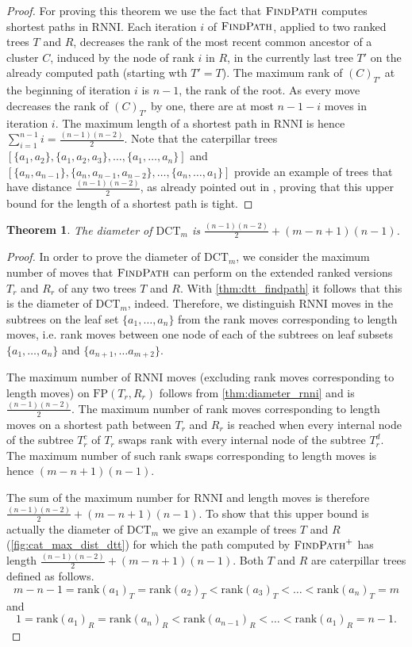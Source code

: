 \documentclass[11pt]{amsart}
\newtheorem{theorem}{Theorem}
\newcommand{\rnni}{\mathrm{RNNI}}
\newcommand{\findpath}{\textsc{FindPath}}
\newcommand{\rank}{\mathrm{rank}}
\newcommand{\fp}{\mathrm{FP}}
\newcommand{\dct}{\mathrm{DCT}}
\begin{document}
\begin{proof}
	For proving this theorem we use the fact that $\findpath$ computes shortest paths in $\rnni$.
	Each iteration $i$ of $\findpath$, applied to two ranked trees $T$ and $R$, decreases the rank of the most recent common ancestor of a cluster $C$, induced by the node of rank $i$ in $R$, in the currently last tree $T'$ on the already computed path (starting wth $T' = T$).
	The maximum rank of $(C)_{T'}$ at the beginning of iteration $i$ is $n-1$, the rank of the root.
	As every move decreases the rank of $(C)_{T'}$ by one, there are at most $n-1-i$ moves in iteration $i$.
	The maximum length of a shortest path in $\rnni$ is hence $\sum \limits_{i = 1}^{n-1} i = \frac{(n-1)(n-2)}{2}$.
	Note that the caterpillar trees $[\{a_1, a_2\}, \{a_1, a_2, a_3\}, \ldots, \{a_1, \ldots, a_n\}]$ and $[\{a_n, a_{n-1}\}, \{a_n, a_{n-1}, a_{n-2}\}, \ldots, \{a_n, \ldots, a_1\}]$ provide an example of trees that have distance $\frac{(n-1)(n-2)}{2}$, as already pointed out in \autocite[Corollary 1]{Collienne2021}, proving that this upper bound for the length of a shortest path is tight.
\end{proof}

\begin{theorem}
	The diameter of $\dct_m$ is $\frac{(n-1)(n-2)}{2} + (m-n+1)(n-1)$.
	\label{thm:dtt_diameter}
\end{theorem}

\begin{proof}
	In order to prove the diameter of $\dct_m$, we consider the maximum number of moves that $\findpath$ can perform on the extended ranked versions $T_r$ and $R_r$ of any two trees $T$ and $R$.
	With \autoref{thm:dtt_findpath} it follows that this is the diameter of $\dct_m$, indeed.
	Therefore, we distinguish $\rnni$ moves in the subtrees on the leaf set $\{a_1, \ldots, a_n\}$ from the rank moves corresponding to length moves, i.e. rank moves between one node of each of the subtrees on leaf subsets $\{a_1, \ldots, a_n\}$ and $\{a_{n+1}, \ldots a_{m+2}\}$.

	The maximum number of $\rnni$ moves (excluding rank moves corresponding to length moves) on $\fp(T_r,R_r)$ follows from \autoref{thm:diameter_rnni} and is $\frac{(n-1)(n-2)}{2}$.
	The maximum number of rank moves corresponding to length moves on a shortest path between $T_r$ and $R_r$ is reached when every internal node of the subtree $T_r^c$ of $T_r$ swaps rank with every internal node of the subtree $T_r^d$.
	The maximum number of such rank swaps corresponding to length moves is hence $(m-n+1)(n-1)$.

	The sum of the maximum number for $\rnni$ and length moves is therefore $\frac{(n-1)(n-2)}{2} + (m-n+1)(n-1)$.
	To show that this upper bound is actually the diameter of $\dct_m$ we give an example of trees $T$ and $R$ (\autoref{fig:cat_max_dist_dtt}) for which the path computed by $\findpath^+$ has length $\frac{(n-1)(n-2)}{2} + (m-n+1)(n-1)$.
	Both $T$ and $R$ are caterpillar trees defined as follows.
	\[m-n-1 = \rank(a_1)_T = \rank(a_2)_T < \rank(a_3)_T < \ldots < \rank(a_n)_T = m\]
	and
	\[1 = \rank(a_1)_R = \rank(a_n)_R < \rank(a_{n-1})_R < \ldots < \rank(a_1)_R = n-1.\]
\end{proof}
\end{document}
